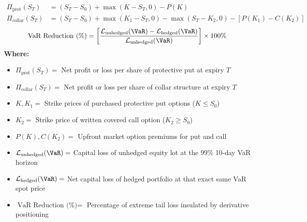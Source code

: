 \begin{formulabox}
\begin{align*}
\Pi_{\text{prot}}(S_T) &= (S_T - S_0) + \max(K - S_T, 0) - P(K) \\
\Pi_{\text{collar}}(S_T) &= (S_T - S_0) + \max(K_1 - S_T, 0) - \max(S_T - K_2, 0) - [P(K_1) - C(K_2)]
\end{align*}
\begin{equation*}
\text{VaR Reduction (\%)} = \left[ \frac{\mathcal{L}_{\text{unhedged}}(\VaR) - \mathcal{L}_{\text{hedged}}(\VaR)}{\mathcal{L}_{\text{unhedged}}(\VaR)} \right] \times 100\%
\end{equation*}
\textbf{Where:}
\begin{itemize}[leftmargin=1.8em, noitemsep]
    \item $\Pi_{\text{prot}}(S_T) =$ Net profit or loss per share of protective put at expiry $T$
    \item $\Pi_{\text{collar}}(S_T) =$ Net profit or loss per share of collar structure at expiry $T$
    \item $K, K_1 =$ Strike prices of purchased protective put options ($K \le S_0$)
    \item $K_2 =$ Strike price of written covered call option ($K_2 \ge S_0$)
    \item $P(K), C(K_2) =$ Upfront market option premiums for put and call
    \item $\mathcal{L}_{\text{unhedged}}(\VaR) =$ Capital loss of unhedged equity lot at the $99\%$ 10-day VaR horizon
    \item $\mathcal{L}_{\text{hedged}}(\VaR) =$ Net capital loss of hedged portfolio at that exact same VaR spot price
    \item $\text{VaR Reduction (\%)} =$ Percentage of extreme tail loss insulated by derivative positioning
\end{itemize}
\end{formulabox}
